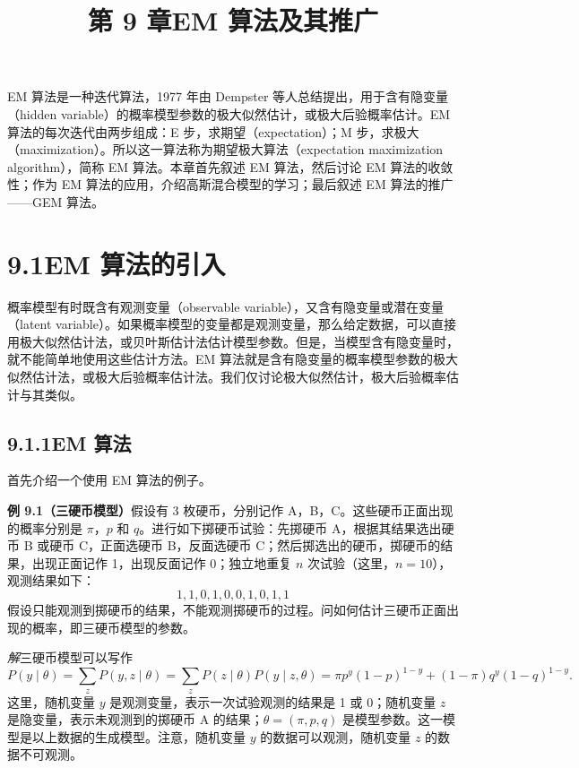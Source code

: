 \documentclass[UTF8, 12pt, fontset=fandol, oneside]{ctexart}
\title{第 9 章\quad EM 算法及其推广}
\author{}
\date{}
\begin{document}
\maketitle

EM 算法是一种迭代算法，1977 年由 Dempster 等人总结提出，用于含有隐变量（hidden variable）的概率模型参数的极大似然估计，或极大后验概率估计。EM 算法的每次迭代由两步组成：E 步，求期望（expectation）；M 步，求极大（maximization）。所以这一算法称为期望极大算法（expectation maximization algorithm），简称 EM 算法。本章首先叙述 EM 算法，然后讨论 EM 算法的收敛性；作为 EM 算法的应用，介绍高斯混合模型的学习；最后叙述 EM 算法的推广——GEM 算法。

\section*{9.1\quad EM 算法的引入}

概率模型有时既含有观测变量（observable variable），又含有隐变量或潜在变量（latent variable）。如果概率模型的变量都是观测变量，那么给定数据，可以直接用极大似然估计法，或贝叶斯估计法估计模型参数。但是，当模型含有隐变量时，就不能简单地使用这些估计方法。EM 算法就是含有隐变量的概率模型参数的极大似然估计法，或极大后验概率估计法。我们仅讨论极大似然估计，极大后验概率估计与其类似。

\subsection*{9.1.1\quad EM 算法}

首先介绍一个使用 EM 算法的例子。

\noindent\textbf{例 9.1（三硬币模型）}\quad 假设有 3 枚硬币，分别记作 A，B，C。这些硬币正面出现的概率分别是 $\pi$，$p$ 和 $q$。进行如下掷硬币试验：先掷硬币 A，根据其结果选出硬币 B 或硬币 C，正面选硬币 B，反面选硬币 C；然后掷选出的硬币，掷硬币的结果，出现正面记作 1，出现反面记作 0；独立地重复 $n$ 次试验（这里，$n=10$），观测结果如下：
\[
  1,1,0,1,0,0,1,0,1,1
\]
假设只能观测到掷硬币的结果，不能观测掷硬币的过程。问如何估计三硬币正面出现的概率，即三硬币模型的参数。

\noindent\textit{解}\quad 三硬币模型可以写作
\begin{equation}
  P(y\mid\theta)=\sum_z P(y,z\mid\theta)=\sum_z P(z\mid\theta)P(y\mid z,\theta)
  =\pi p^y(1-p)^{1-y}+(1-\pi)q^y(1-q)^{1-y}.
  \tag{9.1}
\end{equation}
这里，随机变量 $y$ 是观测变量，表示一次试验观测的结果是 1 或 0；随机变量 $z$ 是隐变量，表示未观测到的掷硬币 A 的结果；$\theta=(\pi,p,q)$ 是模型参数。这一模型是以上数据的生成模型。注意，随机变量 $y$ 的数据可以观测，随机变量 $z$ 的数据不可观测。
\end{document}
